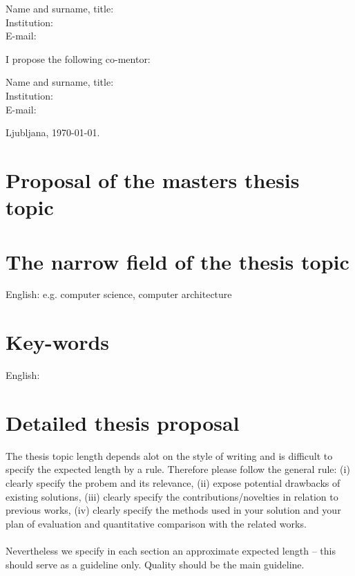 \documentclass[a4paper, 12pt]{article}
\newcommand\cmnt[1]{\textcolor{munsell}{#1}}
\begin{document}
\hfill\begin{minipage}{\dimexpr\textwidth-2cm}
Name and surname, title: \\
Institution: \\
E-mail:
\end{minipage}

I propose the following co-mentor:

\hfill\begin{minipage}{\dimexpr\textwidth-2cm}
Name and surname, title: \\
Institution: \\
E-mail:
\end{minipage}

\bigskip

\hfill Ljubljana, \today.


\clearpage
\section*{Proposal of the masters thesis topic}

\section{The narrow field of the thesis topic}

English: e.g. computer science, computer architecture


\section{Key-words}

English:


\section{Detailed thesis proposal}
\cmnt{
The thesis topic length depends alot on the style of writing and is difficult to specify the expected length by a rule. Therefore please follow the general rule: (i) clearly specify the probem and its relevance, (ii) expose potential drawbacks of existing solutions, (iii) clearly specify the contributions/novelties in relation to previous works, (iv) clearly specify the methods used in your solution and your plan of evaluation and quantitative comparison with the related works.
\\
\\
Nevertheless we specify in each section an approximate expected length -- this should serve as a guideline only. Quality should be the main guideline.}
\end{document}
